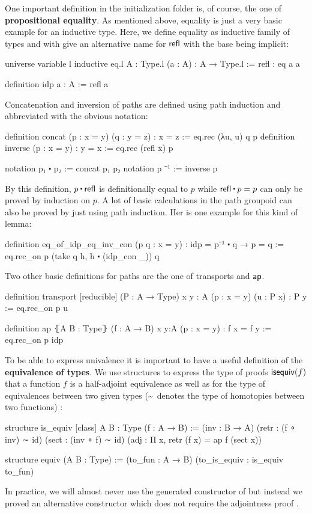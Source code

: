 One important definition in the initialization folder is, of course, the one of
\textbf{propositional equality}.
As mentioned above, equality is just a very basic example for an inductive type.
Here, we define equality as inductive family of types  and with 
give an alternative name for $\mathsf{refl}$ with the base being implicit:
\begin{leancode}
universe variable l
inductive eq.{l} {A : Type.{l}} (a : A) : A → Type.{l} :=
refl : eq a a

definition idp {a : A} := refl a
\end{leancode}
Concatenation and inversion of paths are defined using path induction and abbreviated
with the obvious notation:
\begin{leancode}
definition concat (p : x = y) (q : y = z) : x = z := eq.rec (λu, u) q p
definition inverse (p : x = y) : y = x := eq.rec (refl x) p

notation p₁ ⬝ p₂ := concat p₁ p₂
notation p ⁻¹ := inverse p
\end{leancode}
By this definition, $p \ct \refl$ is definitionally equal to $p$ while $\refl \ct p = p$
can only be proved by induction on $p$.
A lot of basic calculations in the path groupoid can also be proved by just using
path induction. Her is one example for this kind of lemma:
\begin{leancode}
definition eq_of_idp_eq_inv_con (p q : x = y) : idp = p⁻¹ ⬝ q → p = q :=
eq.rec_on p (take q h, h ⬝ (idp_con _)) q
\end{leancode}
Two other basic definitions for paths are the one of transports and $\mathsf{ap}$.
\begin{leancode}
definition transport [reducible] (P : A → Type) {x y : A}
  (p : x = y) (u : P x) : P y :=
eq.rec_on p u

definition ap ⦃A B : Type⦄ (f : A → B) {x y:A} (p : x = y) : f x = f y :=
eq.rec_on p idp
\end{leancode}

To be able to express univalence it is important to have a useful definition of
the \textbf{equivalence of types}.
We use structures to express the type of proofs $\mathsf{isequiv}(f)$ that a function $f$
is a half-adjoint equivalence as well as for the type of equivalences between
two given types (\textasciitilde \, denotes the type of homotopies between two functions) :
\begin{leancode}
structure is_equiv [class] {A B : Type} (f : A → B) :=
  (inv : B → A)
  (retr : (f ∘ inv) ∼ id)
  (sect : (inv ∘ f) ∼ id)
  (adj : Π x, retr (f x) = ap f (sect x))

structure equiv (A B : Type) :=
  (to_fun : A → B)
  (to_is_equiv : is_equiv to_fun)
\end{leancode}
In practice, we will almost never use the generated constructor of 
but instead we proved an alternative constructor  which does
not require the adjointness proof .

